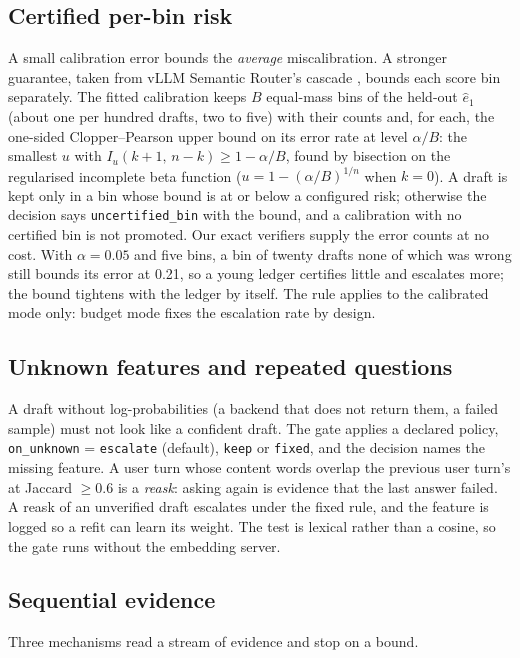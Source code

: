 \subsection{Certified per-bin risk}
\label{sec:gate:bins}
A small calibration error bounds the \emph{average} miscalibration. A stronger
guarantee, taken from vLLM Semantic Router's cascade
\cite{semanticrouter2026}, bounds each score bin separately. The fitted
calibration keeps $B$ equal-mass bins of the held-out $\hat e_1$ (about one per
hundred drafts, two to five) with their counts and, for each, the one-sided
Clopper--Pearson \cite{clopper1934} upper bound on its error rate at level
$\alpha/B$: the smallest $u$ with $I_u(k{+}1,\,n{-}k)\ge 1-\alpha/B$, found by
bisection on the regularised incomplete beta function ($u=1-(\alpha/B)^{1/n}$
when $k=0$). A draft is kept only in a bin whose bound is at or below a
configured risk; otherwise the decision says \texttt{uncertified\_bin} with
the bound, and a calibration with no certified bin is not promoted. Our exact
verifiers supply the error counts at no cost. With $\alpha=0.05$ and five
bins, a bin of twenty drafts none of which was wrong still bounds its error at
0.21, so a young ledger certifies little and escalates more; the bound
tightens with the ledger by itself. The rule applies to the calibrated mode
only: budget mode fixes the escalation rate by design.

\subsection{Unknown features and repeated questions}
A draft without log-probabilities (a backend that does not return them, a
failed sample) must not look like a confident draft. The gate applies a
declared policy, \texttt{on\_unknown} = \texttt{escalate} (default),
\texttt{keep} or \texttt{fixed}, and the decision names the missing feature. A
user turn whose content words overlap the previous user turn's at Jaccard
$\ge0.6$ is a \emph{reask}: asking again is evidence that the last answer
failed. A reask of an unverified draft escalates under the fixed rule, and
the feature is logged so a refit can learn its weight. The test is lexical
rather than a cosine, so the gate runs without the embedding server.

\subsection{Sequential evidence}
\label{sec:gate:seq}
Three mechanisms read a stream of evidence and stop on a bound.

